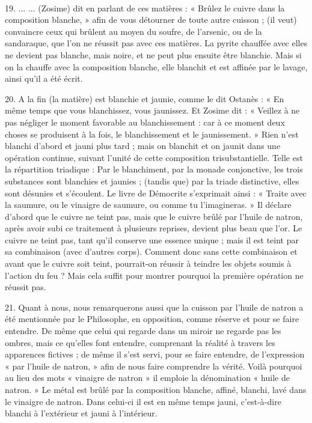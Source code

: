 \documentclass[landscape, a4paper, 11pt, oneside, polutonikogreek, french]{article}
\begin{document}
\paragraph{}
19. ... ... (Zosime) dit en parlant de ces matières : « Brûlez le cuivre dans la composition blanche, » afin de vous détourner de toute autre cuisson ; (il veut) convaincre ceux qui brûlent au moyen du soufre, de l'arsenic, ou de la sandaraque, que l'on ne réussit pas avec ces matières. La pyrite chauffée avec elles ne devient pas blanche, mais noire, et ne peut plus ensuite être blanchie. Mais si on la chauffe avec la composition blanche, elle blanchit et est affinée par le lavage, ainsi qu'il a été écrit.

20. A la fin (la matière) est blanchie et jaunie, comme le dit Ostanès : « En même temps que vous blanchissez, vous jaunissez. Et Zosime dit : « Veillez à ne pas négliger le moment favorable au blanchissement : car à ce moment deux choses se produisent à la fois, le blanchissement et le jaunissement. » Rien n'est blanchi d'abord et jauni plus tard ; mais on blanchit et on jaunit dans une opération continue, suivant l'unité de cette composition trisubstantielle. Telle est la répartition triadique : Par le blanchiment, par la monade conjonctive, les trois substances sont blanchies et jaunies ; (tandis que) par la triade distinctive, elles sont désunies et s'écoulent. Le livre de Démocrite s'exprimait ainsi : « Traite avec la saumure, ou le vinaigre de saumure, ou comme tu l'imagineras. » Il déclare d'abord que le cuivre ne teint pas, mais que le cuivre brûlé par l'huile de natron, après avoir subi ce traitement à plusieurs reprises, devient plus beau que l'or. Le cuivre ne teint pas, tant qu'il conserve une essence unique ; mais il est teint par sa combinaison (avec d'autres corps). Comment donc sans cette combinaison et avant que le cuivre soit teint, pourrait-on réussir à teindre les objets soumis à l'action du feu ? Mais cela suffit pour montrer pourquoi la première opération ne réussit pas.

21. Quant à nous, nous remarquerons aussi que la cuisson par l'huile de natron a été mentionnée par le Philosophe, en opposition, comme réserve et pour se faire entendre. De même que celui qui regarde dans un miroir ne regarde pas les ombres, mais ce qu'elles font entendre, comprenant la réalité à travers les apparences fictives ; de même il s'est servi, pour se faire entendre, de l'expression « par l'huile de natron, » afin de nous faire comprendre la vérité. Voilà pourquoi au lieu des mots « vinaigre de natron » il emploie la dénomination « huile de natron. » Le métal est brûlé par la composition blanche, affiné, blanchi, lavé dans le vinaigre de natron. Dans celui-ci il est en même temps jauni, c'est-à-dire blanchi à l'extérieur et jauni à l'intérieur.
\end{document}
